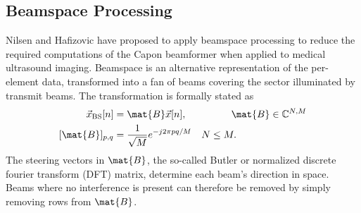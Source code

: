 


\subsection{Beamspace Processing}\label{II_bs-capon}
Nilsen and Hafizovic \cite{Nilsen2009} have proposed to apply beamspace processing to reduce the required computations of the Capon beamformer when applied to medical ultrasound imaging. Beamspace is an alternative representation of the per-element data, transformed into a fan of beams covering the sector illuminated by transmit beams. The transformation is formally stated as
\begin{align}
\vec{x}_\text{BS}[n] &= \mat{B}\vec{x}[n], \ \ \ \ \ \ \ \ \ \ \ \ \ \, \mat{B} \in \mathbb{C}^{N,M} \label{II_eq:butler} \\ 
[\mat{B}]_{p,q} &= \frac{1}{\sqrt{M}}e^{-j 2 \pi p q / M} \ \ \ N \le M.
\end{align} 
The steering vectors in $\mat{B}$, the so-called Butler or normalized discrete fourier transform (DFT) matrix, determine each beam's direction in space. Beams where no interference is present can therefore be removed by simply removing rows from $\mat{B}$. 

